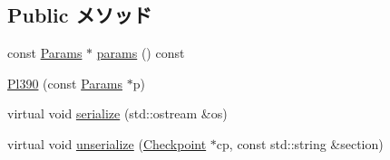 \subsection*{Public メソッド}
\begin{DoxyCompactItemize}
\item 
const \hyperlink{classPl390_a1ac197c7f5e1a7b8d7178444a1474e45}{Params} $\ast$ \hyperlink{classPl390_acd3c3feb78ae7a8f88fe0f110a718dff}{params} () const 
\item 
\hyperlink{classPl390_a0547d5a93535c7865012ca99652733c1}{Pl390} (const \hyperlink{classPl390_a1ac197c7f5e1a7b8d7178444a1474e45}{Params} $\ast$p)
\item 
virtual void \hyperlink{classPl390_a53e036786d17361be4c7320d39c99b84}{serialize} (std::ostream \&os)
\item 
virtual void \hyperlink{classPl390_af22e5d6d660b97db37003ac61ac4ee49}{unserialize} (\hyperlink{classCheckpoint}{Checkpoint} $\ast$cp, const std::string \&section)
\end{DoxyCompactItemize}
